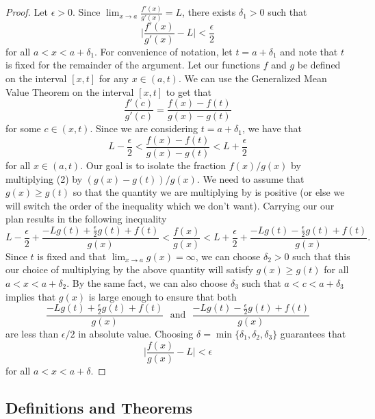 \begin{proof}
Let \( \epsilon > 0  \). Since \( \lim_{ x \to a } \frac{ f'(x)  }{ g'(x)  } = L  \), there exists \( \delta_1 > 0  \) such that 
\[   \Big| \frac{ f'(x)  }{ g'(x) } - L  \Big| < \frac{ \epsilon  }{ 2 } \tag{1} \]
for all \( a < x < a + \delta_1  \). For convenience of notation, let \( t = a + \delta_1  \) and note that \( t  \) is fixed for the remainder of the argument. Let our functions \( f  \) and \( g  \) be defined on the interval \( [x,t] \) for any \( x \in (a,t)  \). We can use the Generalized Mean Value Theorem on the interval \( [x,t]  \) to get that 
\[  \frac{ f'(c)  }{ g'(c)  } = \frac{ f(x) - f(t)  }{ g(x) - g(t)  }  \] for some \( c \in (x,t ) \). Since we are considering \( t = a + \delta_1  \), we have that 
\[  L - \frac{ \epsilon  }{ 2 } < \frac{ f(x) - f(t)  }{ g(x) - g(t) } < L + \frac{ \epsilon  }{ 2 } \tag{2}  \] for all \( x \in (a,t). \) 
Our goal is to isolate the fraction \( f(x) / g(x)  \) by multiplying (2) by \( (g(x) - g(t)) / g(x)  \). We need to assume that \( g(x) \geq g(t)  \) so that the quantity we are multiplying by is positive (or else we will switch the order of the inequality which we don't want). Carrying our our plan results in the following inequality
\[  L - \frac{ \epsilon  }{ 2 }  + \frac{ -Lg(t) + \frac{ \epsilon  }{ 2 } g(t) + f(t)  }{ g(x)  } < \frac{ f(x)  }{ g(x)  } < L + \frac{ \epsilon  }{ 2 } + \frac{ -L g(t) - \frac{ \epsilon  }{ 2 } g(t)  + f(t)  }{ g(x)  }.\]
Since \( t  \) is fixed and that \( \lim_{ x \to a } g(x) = \infty  \), we can choose \( \delta_2 > 0  \) such that this our choice of multiplying by the above quantity will satisfy \( g(x) \geq g(t)  \) for all \( a < x < a + \delta_2 \). By the same fact, we can also choose \( \delta_3  \) such that \( a < c < a + \delta_3  \) implies that \( g(x)  \) is large enough to ensure that both 
\[ \frac{ -Lg(t) + \frac{ \epsilon }{ 2 } g(t) + f(t)   }{ g(x)  } \text{ ~and~ } \frac{ -L g(t) - \frac{ \epsilon  }{ 2 } g(t) + f(t)   }{ g(x)  } \]
are less than  \( \epsilon / 2   \) in absolute value. Choosing \( \delta = \min \{ \delta_1, \delta_2, \delta_3  \}  \) guarantees that 
\[  \Big| \frac{ f(x)  }{ g(x)  } - L  \Big| < \epsilon \]
for all \( a < x < a  + \delta. \)
\end{proof}

\subsection{Definitions and Theorems}


